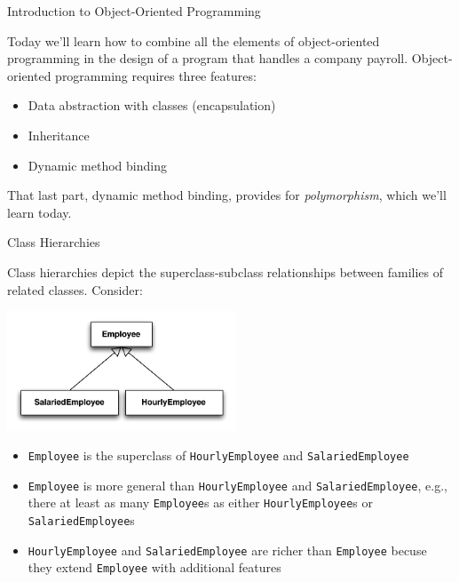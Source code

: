 \documentclass{beamer}
\begin{document}
\begin{frame}
  \titlepage
\end{frame}

\begin{frame}[fragile]{Introduction to Object-Oriented Programming}


Today we'll learn how to combine all the elements of object-oriented programming in the design of a program that handles a company payroll.  Object-oriented programming requires three features:
\begin{itemize}
\item Data abstraction with classes (encapsulation)
\item Inheritance
\item Dynamic method binding
\end{itemize}

That last part, dynamic method binding, provides for {\it polymorphism}, which we'll learn today.

\end{frame}

\begin{frame}[fragile]{Class Hierarchies}

\vspace{-.05in}
Class hierarchies depict the superclass-subclass relationships between families of related classes.  Consider:
\vspace{-.05in}
\begin{center}
\includegraphics[height=1.4in]{employee-class-hierarchy.pdf}
\end{center}
\vspace{-.2in}
\begin{itemize}
\item {\tt Employee} is the superclass of {\tt HourlyEmployee} and {\tt SalariedEmployee}
\item {\tt Employee} is more general than {\tt HourlyEmployee} and {\tt SalariedEmployee}, e.g., there at least as many {\tt Employee}s as either {\tt HourlyEmployee}s or {\tt SalariedEmployee}s
\item {\tt HourlyEmployee} and {\tt SalariedEmployee} are richer than {\tt Employee} becuse they extend {\tt Employee} with additional features
\end{itemize}


\end{frame}
\end{document}
